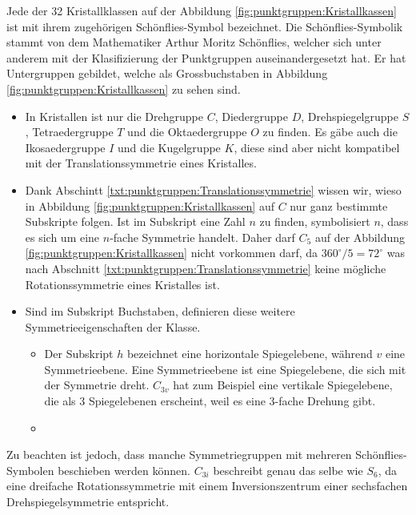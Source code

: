 Jede der 32 Kristallklassen auf der Abbildung \ref{fig:punktgruppen:Kristallkassen} ist mit ihrem zugehörigen Schönflies-Symbol bezeichnet.
 Die Schönflies-Symbolik stammt von dem Mathematiker Arthur Moritz Schönflies, welcher sich unter anderem mit der Klasifizierung der Punktgruppen auseinandergesetzt hat.
 Er hat Untergruppen gebildet, welche als Grossbuchstaben in Abbildung \ref{fig:punktgruppen:Kristallkassen} zu sehen sind.
 \begin{itemize}
   \item In Kristallen ist nur die Drehgruppe \(C\), Diedergruppe \(D\), Drehspiegelgruppe \(S\), Tetraedergruppe \(T\) und die Oktaedergruppe \(O\) zu finden.
     Es gäbe auch die Ikosaedergruppe \(I\) und die Kugelgruppe \(K\), diese sind aber nicht kompatibel mit der Translationssymmetrie eines Kristalles.  
   \item Dank Abschintt \ref{txt:punktgruppen:Translationssymmetrie} wissen wir, wieso in Abbildung \ref{fig:punktgruppen:Kristallkassen} auf \(C\) nur ganz bestimmte Subskripte folgen. Ist im Subskript eine Zahl \(n\) zu finden, symbolisiert \(n\), dass  es sich um eine \(n\)-fache Symmetrie handelt.
     Daher darf \(C_5\) auf der Abbildung \ref{fig:punktgruppen:Kristallkassen} nicht vorkommen darf, da \(360^\circ/5 =  72^\circ\) was nach Abschnitt \ref{txt:punktgruppen:Translationssymmetrie} keine mögliche Rotationssymmetrie eines Kristalles ist.
   \item Sind im Subskript Buchstaben, definieren diese weitere Symmetrieeigenschaften der Klasse.
     \begin{itemize}
       \item Der Subskript \(h\) bezeichnet eine horizontale Spiegelebene, während \(v\) eine Symmetrieebene. Eine Symmetrieebene ist eine Spiegelebene, die sich mit der Symmetrie dreht. \(C_{3v}\) hat zum Beispiel eine vertikale Spiegelebene, die als 3 Spiegelebenen erscheint, weil es eine 3-fache Drehung gibt.
       \item 
     \end{itemize}
 \end{itemize}
Zu beachten ist jedoch, dass manche Symmetriegruppen mit mehreren Schönflies-Symbolen beschieben werden können.
 \(C_{3i}\) beschreibt genau das selbe wie \(S_6\), da eine dreifache Rotationssymmetrie mit einem Inversionszentrum einer sechsfachen Drehspiegelsymmetrie entspricht.




